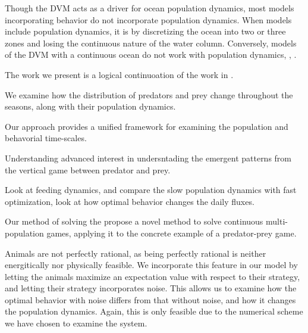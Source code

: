 Though the DVM acts as a driver for ocean population dynamics, most models incorporating behavior do not incorporate population dynamics. When models include population dynamics, it is by discretizing the ocean into two or three zones and losing the continuous nature of the water column. Conversely, models of the DVM with a continuous ocean do not work with population dynamics, \citep{}, \citep{}.

The work we present is a logical continuoation of the work in \citep{}.

We examine how the distribution of predators and prey change throughout the seasons, along with their population dynamics.

Our approach provides a unified framework for examining the population and behavorial time-scales.


Understanding advanced interest in undersntading the emergent patterns from the vertical game between predator and prey.

Look at feeding dynamics, and compare the slow population dynamics with fast optimization, look at how optimal behavior changes the daily fluxes.




%
Our method of solving the propose a novel method to solve continuous multi-population games, applying it to the concrete example of a predator-prey game.

Animals are not perfectly rational, as being perfectly rational is neither energitically nor physically feasible. We incorporate this feature in our model by letting the animals maximize an expectation value with respect to their strategy, and letting their strategy incorporates noise. This allows us to examine how the optimal behavior with noise differs from that without noise, and how it changes the population dynamics. Again, this is only feasible due to the numerical scheme we have chosen to examine the system.
